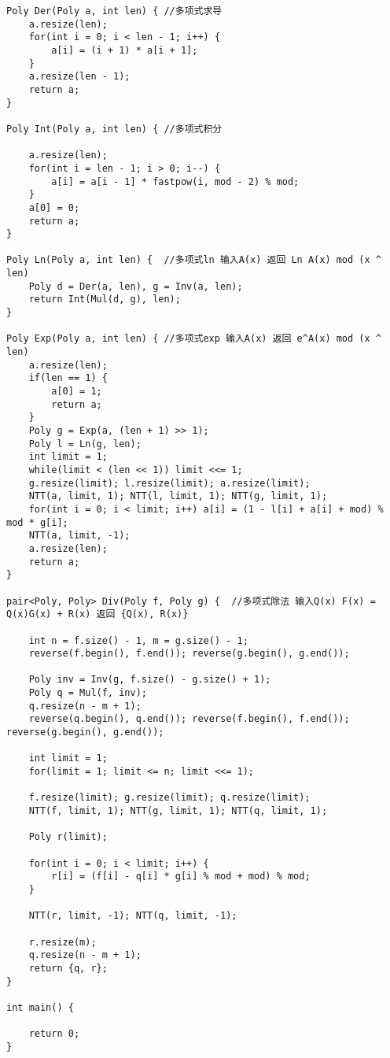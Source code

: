 \begin{lstlisting}
Poly Der(Poly a, int len) {	//多项式求导
	a.resize(len);
	for(int i = 0; i < len - 1; i++) {
		a[i] = (i + 1) * a[i + 1];
	}
	a.resize(len - 1);
	return a;
}

Poly Int(Poly a, int len) {	//多项式积分
	
	a.resize(len);
	for(int i = len - 1; i > 0; i--) {
		a[i] = a[i - 1] * fastpow(i, mod - 2) % mod;
	}
	a[0] = 0;
	return a;
}

Poly Ln(Poly a, int len) {	//多项式ln 输入A(x) 返回 Ln A(x) mod (x ^ len)
	Poly d = Der(a, len), g = Inv(a, len);
	return Int(Mul(d, g), len);
}

Poly Exp(Poly a, int len) {	//多项式exp 输入A(x) 返回 e^A(x) mod (x ^ len)
	a.resize(len);
	if(len == 1) {
		a[0] = 1;
		return a;
	}
	Poly g = Exp(a, (len + 1) >> 1);
	Poly l = Ln(g, len);
	int limit = 1;
	while(limit < (len << 1)) limit <<= 1;
	g.resize(limit); l.resize(limit); a.resize(limit);
	NTT(a, limit, 1); NTT(l, limit, 1); NTT(g, limit, 1);
	for(int i = 0; i < limit; i++) a[i] = (1 - l[i] + a[i] + mod) % mod * g[i];
	NTT(a, limit, -1);
	a.resize(len);
	return a;
}

pair<Poly, Poly> Div(Poly f, Poly g) {	//多项式除法 输入Q(x) F(x) = Q(x)G(x) + R(x) 返回 {Q(x), R(x)}
	
	int n = f.size() - 1, m = g.size() - 1;		
	reverse(f.begin(), f.end()); reverse(g.begin(), g.end());
	
	Poly inv = Inv(g, f.size() - g.size() + 1);
	Poly q = Mul(f, inv);
	q.resize(n - m + 1);
	reverse(q.begin(), q.end()); reverse(f.begin(), f.end()); reverse(g.begin(), g.end());
	
	int limit = 1;
	for(limit = 1; limit <= n; limit <<= 1);
	
	f.resize(limit); g.resize(limit); q.resize(limit);
	NTT(f, limit, 1); NTT(g, limit, 1); NTT(q, limit, 1);
	
	Poly r(limit);
	
	for(int i = 0; i < limit; i++) {
		r[i] = (f[i] - q[i] * g[i] % mod + mod) % mod;
	}
	
	NTT(r, limit, -1); NTT(q, limit, -1);
	
	r.resize(m);
	q.resize(n - m + 1);
	return {q, r};
}

int main() {
	
	return 0;
}

\end{lstlisting}